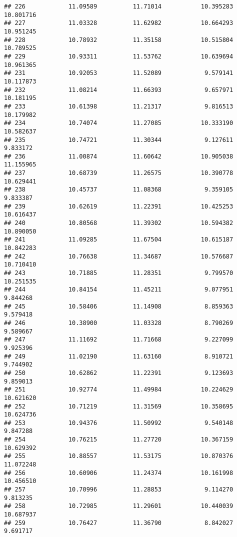 \documentclass[
]{article}
\begin{document}
\begin{verbatim}
## 226            11.09589          11.71014           10.395283         10.801716
## 227            11.03328          11.62982           10.664293         10.951245
## 228            10.78932          11.35158           10.515804         10.789525
## 229            10.93311          11.53762           10.639694         10.961365
## 231            10.92053          11.52089            9.579141         10.117873
## 232            11.08214          11.66393            9.657971         10.181195
## 233            10.61398          11.21317            9.816513         10.179982
## 234            10.74074          11.27085           10.333190         10.582637
## 235            10.74721          11.30344            9.127611          9.833172
## 236            11.00874          11.60642           10.905038         11.155965
## 237            10.68739          11.26575           10.390778         10.629441
## 238            10.45737          11.08368            9.359105          9.833387
## 239            10.62619          11.22391           10.425253         10.616437
## 240            10.80568          11.39302           10.594382         10.890050
## 241            11.09285          11.67504           10.615187         10.842283
## 242            10.76638          11.34687           10.576687         10.710410
## 243            10.71885          11.28351            9.799570         10.251535
## 244            10.84154          11.45211            9.077951          9.844268
## 245            10.58406          11.14908            8.859363          9.579418
## 246            10.38900          11.03328            8.790269          9.589667
## 247            11.11692          11.71668            9.227099          9.925396
## 249            11.02190          11.63160            8.910721          9.744902
## 250            10.62862          11.22391            9.123693          9.859013
## 251            10.92774          11.49984           10.224629         10.621620
## 252            10.71219          11.31569           10.358695         10.624736
## 253            10.94376          11.50992            9.540148          9.847288
## 254            10.76215          11.27720           10.367159         10.629392
## 255            10.88557          11.53175           10.870376         11.072248
## 256            10.60906          11.24374           10.161998         10.456510
## 257            10.70996          11.28853            9.114270          9.813235
## 258            10.72985          11.29601           10.440039         10.687937
## 259            10.76427          11.36790            8.842027          9.691717

\end{verbatim}
\end{document}
